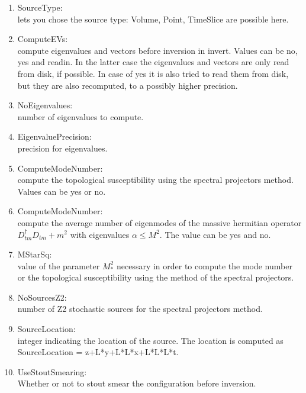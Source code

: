 \begin{enumerate}
\item {\ttfamily SourceType}:\\
  lets you chose the source type: {\ttfamily Volume, Point, TimeSlice}
  are possible here.

\item {\ttfamily ComputeEVs}:\\
  compute eigenvalues and vectors before inversion in invert. Values
  can be no, yes and readin. In the latter case the eigenvalues and
  vectors are only read from disk, if possible. In case of yes it is
  also tried to read them from disk, but they are also recomputed, to
  a possibly higher precision.

\item {\ttfamily NoEigenvalues}:\\
  number of eigenvalues to compute.

\item {\ttfamily EigenvaluePrecision}:\\
  precision for eigenvalues.

\item {\ttfamily ComputeModeNumber}:\\
  compute the topological susceptibility using the spectral projectors
  method. Values can be yes or no.

\item {\ttfamily ComputeModeNumber}:\\
  compute the average number of eigenmodes of the massive hermitian
  operator $D_{tm}^{\dagger}D_{tm}+m^2$ with eigenvalues
  $\alpha\leq M^2$. The value can be
  yes and no.

\item {\ttfamily MStarSq}:\\
  value of the parameter $M_*^2$ necessary in order to compute the
  mode number or the topological susceptibility using the method of
  the spectral projectors.

\item {\ttfamily NoSourcesZ2}:\\
  number of Z2 stochastic sources for the spectral projectors method.

\item {\ttfamily SourceLocation}:\\
  integer indicating the location of the source. The location is computed as
  {\ttfamily SourceLocation = z+L*y+L*L*x+L*L*L*t}.

\item {\ttfamily UseStoutSmearing}:\\
  Whether or not to stout smear the configuration before inversion.


\end{enumerate}
